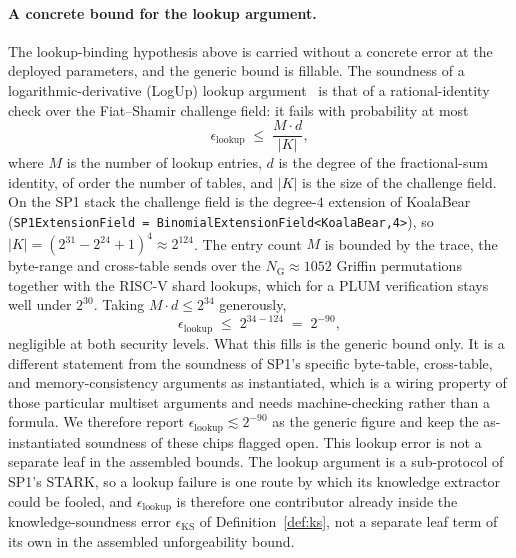 \paragraph{A concrete bound for the lookup argument.}
The lookup-binding hypothesis above is carried without a concrete error at the deployed parameters, and the generic bound is fillable. The soundness of a logarithmic-derivative (LogUp) lookup argument~\cite{haback2022logup} is that of a rational-identity check over the Fiat--Shamir challenge field: it fails with probability at most
\begin{equation*}
  \epsilon_{\mathrm{lookup}}\;\le\;\frac{M\cdot d}{|K|},
\end{equation*}
where $M$ is the number of lookup entries, $d$ is the degree of the fractional-sum identity, of order the number of tables, and $|K|$ is the size of the challenge field. On the SP1 stack the challenge field is the degree-$4$ extension of KoalaBear (\texttt{SP1ExtensionField = BinomialExtensionField<KoalaBear,4>}), so $|K|=(2^{31}-2^{24}+1)^4\approx2^{124}$. The entry count $M$ is bounded by the trace, the byte-range and cross-table sends over the $N_{\mathrm G}\approx1052$ Griffin permutations together with the RISC-V shard lookups, which for a PLUM verification stays well under $2^{30}$. Taking $M\cdot d\le2^{34}$ generously,
\begin{equation*}
  \epsilon_{\mathrm{lookup}}\;\le\;2^{34-124}\;=\;2^{-90},
\end{equation*}
negligible at both security levels. What this fills is the generic bound only. It is a different statement from the soundness of SP1's specific byte-table, cross-table, and memory-consistency arguments as instantiated, which is a wiring property of those particular multiset arguments and needs machine-checking rather than a formula. We therefore report $\epsilon_{\mathrm{lookup}}\lesssim2^{-90}$ as the generic figure and keep the as-instantiated soundness of these chips flagged open. This lookup error is not a separate leaf in the assembled bounds. The lookup argument is a sub-protocol of SP1's STARK, so a lookup failure is one route by which its knowledge extractor could be fooled, and $\epsilon_{\mathrm{lookup}}$ is therefore one contributor already inside the knowledge-soundness error $\epsilon_{\mathrm{KS}}$ of Definition~\ref{def:ks}, not a separate leaf term of its own in the assembled unforgeability bound.

